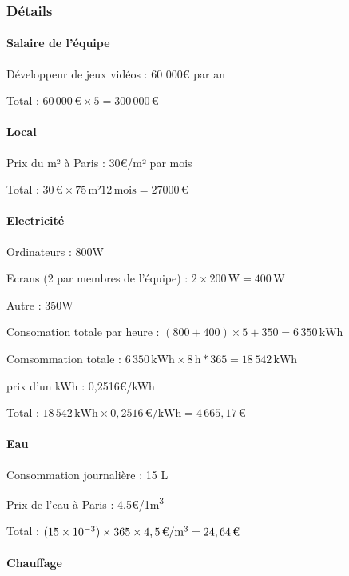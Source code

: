 \documentclass{article}
\begin{document}
\subsubsection{Détails}
\paragraph{Salaire de l'équipe}\hfill

Développeur de jeux vidéos : 60 000€ par an

Total : $60\,000\,\text{€} \times 5 = 300\,000\,\text{€}$

\paragraph{Local}\hfill

Prix du m² à Paris : 30€/m² par mois

Total : $30\,\text{€} \times 75\,\text{m²} 12\,\text{mois} = 27 000\,\text{€}$

\paragraph{Electricité}\hfill

Ordinateurs : 800W

Ecrans (2 par membres de l'équipe) : $2 \times 200\,\text{W} = 400\,\text{W}$

Autre : 350W

Consomation totale par heure : $(800 + 400) \times 5 + 350 = 6\,350\,\text{kWh}$

Comsommation totale : $6\,350\,\text{kWh} \times 8\,\text{h} * 365 = 18\,542\,\text{kWh}$

prix d'un kWh : 0,2516€/kWh 

Total : $18\,542\,\text{kWh} \times 0,2516\,\text{€/kWh} = 4\,665,17\,\text{€}$

\paragraph{Eau}\hfill

Consommation journalière : 15 L

Prix de l'eau à Paris : 4.5€/1m\textsuperscript{3}

Total : $(15 \times 10^{-3}) \times 365 \times 4,5\,\text{€/m\textsuperscript{3}} = 24,64\,\text{€}$

\paragraph{Chauffage}\hfill
\end{document}
